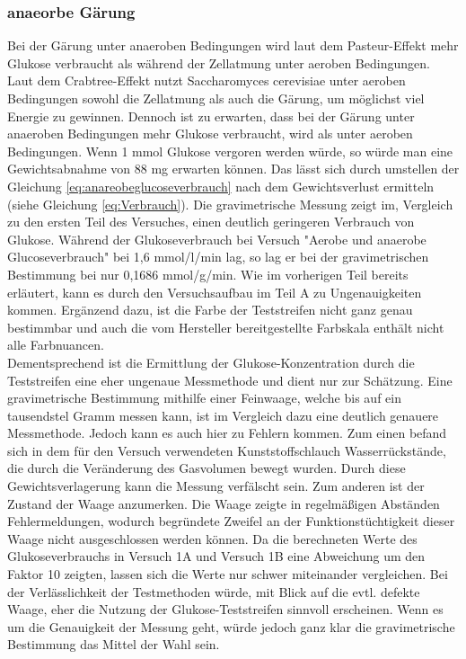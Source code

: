 \documentclass[10pt,a4paper]{article}
\begin{document}
		
	\subsubsection{anaeorbe Gärung}	
	Bei der Gärung unter anaeroben Bedingungen wird laut dem Pasteur-Effekt mehr Glukose verbraucht als während der Zellatmung unter aeroben Bedingungen. Laut dem Crabtree-Effekt nutzt Saccharomyces cerevisiae unter aeroben Bedingungen sowohl die Zellatmung als auch die Gärung, um möglichst viel Energie zu gewinnen. Dennoch ist zu erwarten, dass bei der Gärung unter anaeroben Bedingungen mehr Glukose verbraucht, wird als unter aeroben Bedingungen. Wenn 1 mmol Glukose vergoren werden würde, so würde man eine Gewichtsabnahme von 88 mg erwarten können. Das lässt sich durch umstellen der Gleichung  \ref{eq:anareobeglucoseverbrauch} nach dem Gewichtsverlust ermitteln (siehe Gleichung  \ref{eq:Verbrauch}). Die gravimetrische Messung zeigt im, Vergleich zu den ersten Teil des Versuches, einen deutlich geringeren Verbrauch von Glukose. Während der Glukoseverbrauch bei Versuch "Aerobe und anaerobe Glucoseverbrauch" bei 1,6 mmol/l/min lag, so lag er bei der gravimetrischen Bestimmung bei nur 0,1686 mmol/g/min. Wie im vorherigen Teil bereits erläutert, kann es durch den Versuchsaufbau im Teil A zu Ungenauigkeiten kommen. Ergänzend dazu, ist die Farbe der Teststreifen nicht ganz genau bestimmbar und auch die vom Hersteller bereitgestellte Farbskala enthält nicht alle Farbnuancen.\\ Dementsprechend ist die Ermittlung der Glukose-Konzentration durch die Teststreifen eine eher ungenaue Messmethode und dient nur zur Schätzung. Eine gravimetrische Bestimmung mithilfe einer Feinwaage, welche bis auf ein tausendstel Gramm messen kann, ist im Vergleich dazu eine deutlich genauere Messmethode. Jedoch kann es auch hier zu Fehlern kommen. Zum einen befand sich in dem für den Versuch verwendeten Kunststoffschlauch Wasserrückstände, die durch die Veränderung des Gasvolumen bewegt wurden. Durch diese Gewichtsverlagerung kann die Messung verfälscht sein. Zum anderen ist der Zustand der Waage anzumerken. Die Waage zeigte in regelmäßigen Abständen Fehlermeldungen, wodurch begründete Zweifel an der Funktionstüchtigkeit dieser Waage nicht ausgeschlossen werden können. Da die berechneten Werte des Glukoseverbrauchs in Versuch 1A und Versuch 1B eine Abweichung um den Faktor 10 zeigten, lassen sich die Werte nur schwer miteinander vergleichen. Bei der Verlässlichkeit der Testmethoden würde, mit Blick auf die evtl. defekte Waage, eher die Nutzung der Glukose-Teststreifen sinnvoll erscheinen. Wenn es um die Genauigkeit der Messung geht, würde jedoch ganz klar die gravimetrische Bestimmung das Mittel der Wahl sein.
	
\end{document}

